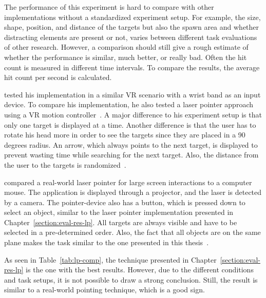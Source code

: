 The performance of this experiment is hard to compare with other implementations without a standardized experiment setup. For example, the size, shape, position, and distance of the targets but also the spawn area and whether distracting elements are present or not, varies between different task evaluations of other research. However, a comparison should still give a rough estimate of whether the performance is similar, much better, or really bad. Often the hit count is measured in different time intervals. To compare the results, the average hit count per second is calculated.

\citeauthor{Kamm.2018} tested his implementation in a similar \ac{VR} scenario with a wrist band as an input device. To compare his implementation, he also tested a laser pointer approach using a \ac{VR} motion controller~\cite[39]{Kamm.2018}. A major difference to his experiment setup is that only one target is displayed at a time. Another difference is that the user has to rotate his head more in order to see the targets since they are placed in a 90 degrees radius. An arrow, which always points to the next target, is displayed to prevent wasting time while searching for the next target. Also, the distance from the user to the targets is randomized~\cite[45]{Kamm.2018}.

\citeauthor{JiYoungOh.2002} compared a real-world laser pointer for large screen interactions to a computer mouse. The application is displayed through a projector, and the laser is detected by a camera. The pointer-device also has a button, which is pressed down to select an object, similar to the laser pointer implementation presented in Chapter~\ref{section:eval-res-lp}. All targets are always visible and have to be selected in a pre-determined order. Also, the fact that all objects are on the same plane makes the task similar to the one presented in this thesis~\cite[3\psq]{JiYoungOh.2002}.

As seen in Table~\ref{tab:lp-comp}, the technique presented in Chapter~\ref{section:eval-res-lp} is the one with the best results. However, due to the different conditions and task setups, it is not possible to draw a strong conclusion. Still, the result is similar to a real-world pointing technique, which is a good sign.

